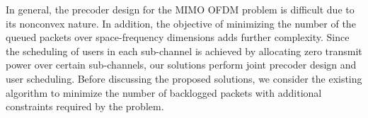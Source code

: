 In general, the precoder design for the \ac{MIMO} \ac{OFDM} problem is difficult due to its nonconvex nature. In addition, the objective of minimizing the number of the queued packets over space-frequency dimensions adds further complexity. Since the scheduling of users in each sub-channel is achieved by allocating zero transmit power over certain sub-channels, our solutions perform joint precoder design and user scheduling. Before discussing the proposed solutions, we consider the existing algorithm to minimize the number of backlogged packets with additional constraints required by the problem.